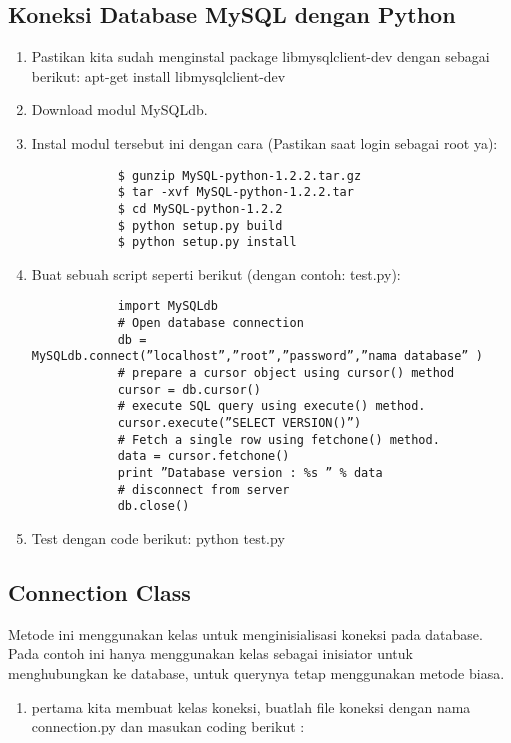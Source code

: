 \begin{enumerate}
\subsection {Koneksi Database MySQL dengan Python}
	\begin{enumerate}
		\item  Pastikan kita sudah menginstal package libmysqlclient-dev dengan sebagai berikut: 
		       apt-get install libmysqlclient-dev 
		\item  Download modul MySQLdb.
		\item  Instal modul tersebut ini dengan cara (Pastikan saat login sebagai root ya):
			\begin{verbatim}
			$ gunzip MySQL-python-1.2.2.tar.gz 
			$ tar -xvf MySQL-python-1.2.2.tar 
			$ cd MySQL-python-1.2.2 
			$ python setup.py build 
			$ python setup.py install 
			\end{verbatim}
		\item  Buat sebuah script seperti berikut (dengan contoh: test.py):
			\begin{verbatim}
			import MySQLdb 
			# Open database connection 
			db = MySQLdb.connect(”localhost”,”root”,”password”,”nama database” ) 
			# prepare a cursor object using cursor() method 
			cursor = db.cursor() 
			# execute SQL query using execute() method. 
			cursor.execute(”SELECT VERSION()”) 
			# Fetch a single row using fetchone() method. 
			data = cursor.fetchone() 
			print ”Database version : %s ” % data 
			# disconnect from server 
			db.close()
			\end{verbatim}
		\item Test dengan code berikut:
		      python test.py 
	\end{enumerate}
\subsection {Connection Class}
Metode ini menggunakan kelas untuk menginisialisasi koneksi pada database. 
Pada contoh ini hanya menggunakan kelas sebagai inisiator untuk menghubungkan ke database, 
untuk querynya tetap menggunakan metode biasa.
\begin{enumerate}
\item pertama kita membuat kelas koneksi, buatlah file koneksi dengan nama connection.py dan masukan coding berikut :


\end{enumerate}
\end{enumerate}
